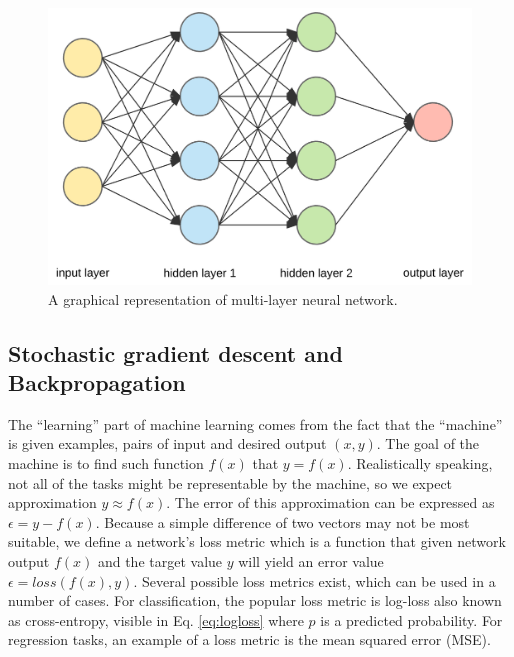 \begin{figure}
  \centering
  \includegraphics[width=0.5\linewidth]{figures/chapter3/1_3fA77_mLNiJTSgZFhYnU0Q.png}
  \caption[multilayer ann]{A graphical representation of multi-layer neural network\footnotemark. }
  \label{fig:multilayer_neuron}
\end{figure}

\subsection{Stochastic gradient descent and Backpropagation}

The ``learning'' part of machine learning comes from the fact that the ``machine'' is given examples, pairs of input and desired output $(x,y)$.
The goal of the machine is to find such function $f(x)$ that $y=f(x)$.
Realistically speaking, not all of the tasks might be representable by the machine, so we expect approximation $y \approx f(x)$.
The error of this approximation can be expressed as $\epsilon = y - f(x)$.
Because a simple difference of two vectors may not be most suitable, we define a network's loss metric which is a function that given network output $f(x)$ and the target value $y$ will yield an error value $\epsilon = loss(f(x), y)$.
Several possible loss metrics exist, which can be used in a number of cases.
For classification, the popular loss metric is log-loss also known as cross-entropy, visible in Eq. \ref{eq:logloss} where $p$ is a predicted probability.
For regression tasks, an example of a loss metric is the mean squared error (MSE).

